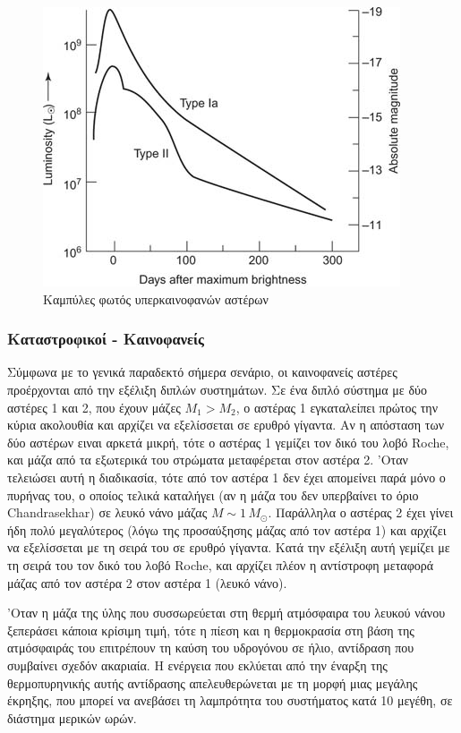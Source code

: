 \begin{figure}
    \centering
    \includegraphics{Figures/sne_light_curves.jpeg}
    \caption{Καμπύλες φωτός υπερκαινοφανών αστέρων}
    \label{fig:sne_light_curves}
\end{figure}

\subsubsection{Καταστροφικοί - Καινοφανείς}
Σύμφωνα με το γενικά παραδεκτό σήμερα σενάριο, οι καινοφανείς αστέρες προέρχονται από την εξέλιξη διπλών συστημάτων. Σε ένα διπλό σύστημα με δύο αστέρες 1 και 2, που έχουν μάζες $M_1 > M_2$, ο αστέρας 1 εγκαταλείπει πρώτος την κύρια ακολουθία και αρχίζει να εξελίσσεται σε ερυθρό γίγαντα. Αν η απόσταση των δύο αστέρων ειναι αρκετά μικρή, τότε ο αστέρας 1 γεμίζει τον δικό του λοβό Roche, και μάζα από τα εξωτερικά του στρώματα μεταφέρεται στον αστέρα 2. 'Οταν τελειώσει αυτή η διαδικασία, τότε από τον αστέρα 1 δεν έχει απομείνει παρά μόνο ο πυρήνας του, ο οποίος τελικά καταλήγει (αν η μάζα του δεν υπερβαίνει το όριο Chandrasekhar) σε λευκό νάνο μάζας $M \sim 1\,M_\odot$. Παράλληλα ο αστέρας 2 έχει γίνει ήδη πολύ μεγαλύτερος (λόγω της προσαύξησης μάζας από τον αστέρα 1) και αρχίζει να εξελίσσεται με τη σειρά του σε ερυθρό γίγαντα. Κατά την εξέλιξη αυτή γεμίζει με τη σειρά του τον δικό του λοβό Roche, και αρχίζει πλέον η αντίστροφη μεταφορά μάζας από τον αστέρα 2 στον αστέρα 1 (λευκό νάνο).

'Οταν η μάζα της ύλης που συσσωρεύεται στη θερμή ατμόσφαιρα του λευκού νάνου ξεπεράσει κάποια κρίσιμη τιμή, τότε η πίεση και η θερμοκρασία στη βάση της ατμόσφαιράς του επιτρέπουν τη καύση του υδρογόνου σε ήλιο, αντίδραση που συμβαίνει σχεδόν ακαριαία. Η ενέργεια που εκλύεται από την έναρξη της θερμοπυρηνικής αυτής αντίδρασης απελευθερώνεται με τη μορφή μιας μεγάλης έκρηξης, που μπορεί να ανεβάσει τη λαμπρότητα του συστήματος κατά 10 μεγέθη, σε διάστημα μερικών ωρών.

